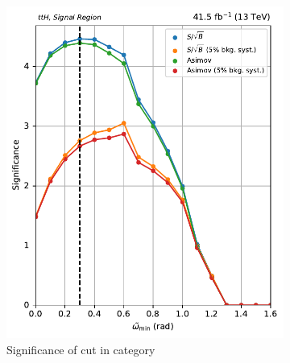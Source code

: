 \begin{figure}[htbp]
    \begin{subfigure}[b]{0.35\textwidth}
        \includegraphics[width=\textwidth]{figures/category_optimisations/with_mindphi_cut/significance_ttH_min_omega_tilde_all.pdf}
        \caption{Significance of cut in \ttH category}
    \end{subfigure}
    \hspace{0.1\textwidth}
    \begin{subfigure}[b]{0.35\textwidth}

\end{subfigure}
\end{figure}
